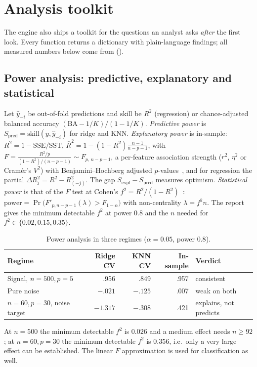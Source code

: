 \documentclass[conference]{IEEEtran}
\begin{document}
\section{Analysis toolkit}\label{sec:toolkit}
The engine also ships a toolkit for the questions an analyst asks \emph{after} the first look. Every function returns a dictionary with plain-language findings; all measured numbers below come from  ().
\subsection{Power analysis: predictive, explanatory and statistical}
Let $\hat y_{-i}$ be out-of-fold predictions and $\mathrm{skill}$ be $R^2$ (regression) or chance-adjusted balanced accuracy $(\mathrm{BA}-1/K)/(1-1/K)$. \emph{Predictive power} is $S_{\mathrm{pred}}=\mathrm{skill}(y,\hat y_{-i})$ for ridge and KNN. \emph{Explanatory power} is in-sample: $R^2=1-\mathrm{SSE}/\mathrm{SST}$, $\bar R^2=1-(1-R^2)\frac{n-1}{n-p-1}$, with $F=\frac{R^2/p}{(1-R^2)/(n-p-1)}\sim F_{p,\,n-p-1}$, a per-feature association strength ($r^2$, $\eta^2$ or Cram\'er's $V^2$) with Benjamini--Hochberg adjusted $p$-values~\cite{bh1995}, and for regression the partial $\Delta R^2_j=R^2-R^2_{(-j)}$. The gap $S_{\mathrm{expl}}-S_{\mathrm{pred}}$ measures optimism. \emph{Statistical power} is that of the $F$ test at Cohen's $f^2=R^2/(1-R^2)$~\cite{cohen1988}: $\mathrm{power}=\Pr\!\big(F'_{p,n-p-1}(\lambda)>F_{1-\alpha}\big)$ with non-centrality $\lambda=f^2 n$. The report gives the minimum detectable $f^2$ at power $0.8$ and the $n$ needed for $f^2\in\{0.02,0.15,0.35\}$.
\begin{table}[t]\caption{Power analysis in three regimes ($\alpha=0.05$, power $0.8$).}\label{tab:power}\centering\scriptsize
\begin{tabular}{@{}lrrrl@{}}\toprule
Regime & Ridge CV & KNN CV & In-sample & Verdict \\\midrule
Signal, $n=500,p=5$ & .956 & .849 & .957 & consistent \\
Pure noise & $-.021$ & $-.125$ & .007 & weak on both \\
$n=60,p=30$, noise target & $-1.317$ & $-.308$ & .421 & explains, not predicts \\\bottomrule
\end{tabular}\end{table}
At $n=500$ the minimum detectable $f^2$ is $0.026$ and a medium effect needs $n\ge 92$; at $n=60,p=30$ the minimum detectable $f^2$ is $0.356$, i.e.\ only a very large effect can be established. The linear $F$ approximation is used for classification as well.
\end{document}
